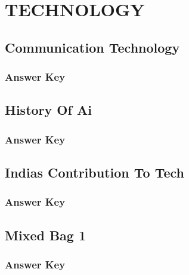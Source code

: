 \documentclass[12pt,a4paper]{book}
\begin{document}


\chapter{TECHNOLOGY}

\section{Communication Technology}



\subsection*{Answer Key}



\section{History Of Ai}



\subsection*{Answer Key}



\section{Indias Contribution To Tech}



\subsection*{Answer Key}



\section{Mixed Bag 1}



\subsection*{Answer Key}
\end{document}

